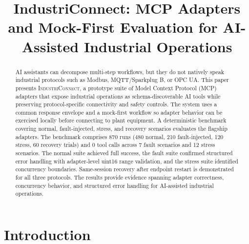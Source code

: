\documentclass[conference]{IEEEtran}
\newcommand{\system}{\textsc{IndustriConnect}}
\newcommand{\totalNormalRuns}{480}
\newcommand{\totalFaultRuns}{210}
\newcommand{\totalStressRuns}{120}
\newcommand{\totalRecoveryTrials}{60}
\newcommand{\totalRuns}{870}
\newcommand{\totalToolCalls}{0}
\begin{document}
\title{IndustriConnect: MCP Adapters and Mock-First Evaluation for AI-Assisted Industrial Operations}

\author{
\and
{}
\and
{}
\and
{}
}

\maketitle

\begin{abstract}
AI assistants can decompose multi-step workflows, but they do not natively speak industrial protocols such as Modbus, MQTT/Sparkplug B, or OPC UA. This paper presents \system, a prototype suite of Model Context Protocol (MCP) adapters that expose industrial operations as schema-discoverable AI tools while preserving protocol-specific connectivity and safety controls. The system uses a common response envelope and a mock-first workflow so adapter behavior can be exercised locally before connecting to plant equipment. A deterministic benchmark covering normal, fault-injected, stress, and recovery scenarios evaluates the flagship adapters. The benchmark comprises \totalRuns{} runs (\totalNormalRuns{} normal, \totalFaultRuns{} fault-injected, \totalStressRuns{} stress, \totalRecoveryTrials{} recovery trials) and \totalToolCalls{} tool calls across 7 fault scenarios and 12 stress scenarios. The normal suite achieved full success, the fault suite confirmed structured error handling with adapter-level uint16 range validation, and the stress suite identified concurrency boundaries. Same-session recovery after endpoint restart is demonstrated for all three protocols. The results provide evidence spanning adapter correctness, concurrency behavior, and structured error handling for AI-assisted industrial operations.
\end{abstract}

\section{Introduction}
\label{sec:introduction}
\end{document}
